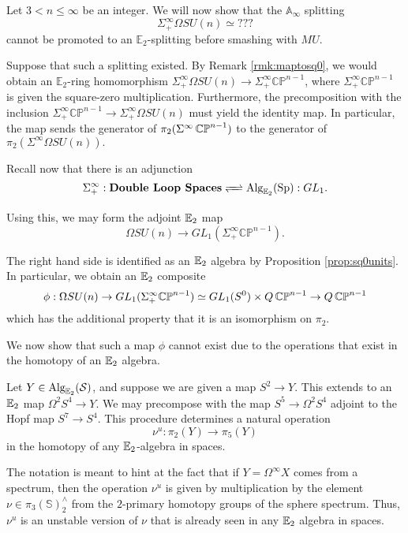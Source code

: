 
Let $3< n\leq \infty$ be an integer.  We will now show that the $\mathbb{A}_\infty$ splitting $$\Sigma^{\infty}_+ \Omega SU(n) \simeq ???$$ cannot be promoted to an $\mathbb{E}_2$-splitting before smashing with $MU$.  

Suppose that such a splitting existed.  By Remark \ref{rmk:maptosq0}, we would obtain an $\mathbb{E}_2$-ring homomorphism $\Sigma^{\infty}_+ \Omega SU(n) \rightarrow \Sigma^{\infty}_+ \mathbb{CP}^{n-1}$, where $\Sigma^{\infty}_+ \mathbb{CP}^{n-1}$ is given the square-zero multiplication.  Furthermore, the precomposition with the inclusion $\Sigma^{\infty}_+ \mathbb{CP}^{n-1} \longrightarrow \Sigma^{\infty}_+ \Omega SU(n)$ must yield the identity map.  In particular, the map sends the generator of $\pi_2(\Sigma^{\infty}\operatorname{\mathbb{CP}}^{n-1})$ to the generator of $\pi_2(\Sigma^{\infty}\Omega SU(n)).$  



Recall now that there is an adjunction \cite{MQRT}
$$\Sigma^{\infty}_+:\textbf{Double Loop Spaces}  \xrightleftharpoons{\quad} \Alg_{\E_2}(\Sp) :GL_1.$$

Using this, we may form the adjoint $\operatorname{\mathbb{E}}_2$ map
$$\Omega SU(n) \rightarrow GL_1(\Sigma^{\infty}_+ \mathbb{CP}^{n-1}).$$

The right hand side is identified as an $\operatorname{\mathbb{E}}_2$ algebra by Proposition \ref{prop:sq0units}.  In particular, we obtain an $\operatorname{\mathbb{E}}_2$ composite $$\phi: \Omega SU(n) \to GL_1(\Sigma^{\infty}_+ \mathbb{CP}^{n-1}) \simeq  GL_1(S^0) \times Q\operatorname{\mathbb{CP}}^{n-1} \to Q\operatorname{\mathbb{CP}}^{n-1}$$ which has the additional property that it is an isomorphism on $\pi_2$.

We now show that such a map $\phi$ cannot exist due to the operations that exist in the homotopy of an $\operatorname{\mathbb{E}}_2$ algebra.  

\begin{obs}Let $Y\in \operatorname{\text{Alg}}_{\operatorname{\mathbb{E}}_2}(\operatorname{\mathcal{S}})$, and suppose we are given a map $S^2\to Y$.  This extends to an $\operatorname{\mathbb{E}}_2$ map $\Omega^2 S^4 \to Y.$  We may precompose with the map $S^5 \to \Omega^2 S^4$ adjoint to the Hopf map $S^7\to S^4$.  This procedure determines a natural operation $$\nu^u: \pi_2(Y) \to \pi_5(Y)$$ in the homotopy of any $\operatorname{\mathbb{E}}_2$-algebra in spaces.  
\end{obs}

\begin{rmk} \label{rmk:multnu}
The notation is meant to hint at the fact that if $Y = \Omega^\infty X$ comes from a spectrum, then the operation $\nu^u$ is given by multiplication by the element $\nu \in \pi_3(\mathbb{S})^{\wedge}_2$ from the $2$-primary homotopy groups of the sphere spectrum.  Thus, $\nu^u$ is an unstable version of $\nu$ that is already seen in any $\operatorname{\mathbb{E}}_2$ algebra in spaces.    
\end{rmk}

